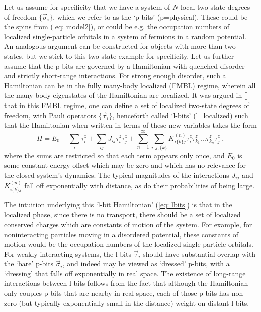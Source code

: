 \documentclass[amsmath,onecolumn, superscriptaddress,preprint,aps]{revtex4}
\renewcommand{\cite}[1]{[\onlinecite{#1}]}
\begin{document}
Let us assume for specificity that we have a system of $N$ local two-state degrees of freedom $\{\vec{\sigma}_i \}$, which we refer to as the `p-bits' (p=physical).
These could be the spins from (\ref{eq: model2}), or could be e.g. the occupation numbers of localized single-particle orbitals in a system of fermions in a
random potential.  An analogous argument can be constructed for objects with more than two states, but we stick to this two-state example for specificity.
Let us further assume that the p-bits are governed by a Hamiltonian with quenched disorder and strictly short-range interactions.
For strong enough disorder, such a Hamiltonian can be in the fully many-body localized (FMBL) regime,
wherein all the many-body eigenstates of the Hamiltonian are localized.
It was argued in \cite{Lbits, Abanin2, Abanin1, Lbits2} that in this FMBL regime, one can define a set of localized two-state degrees of freedom, with Pauli operators
$\{\vec{\tau}_i\}$, henceforth called `l-bits' (l=localized) such that the Hamiltonian when written in terms of these new variables takes the form
%
\begin{equation}
H = E_0 + \sum_{i} \tau^z_i + \sum_{ij} J_{ij} \tau^z_i \tau^z_j + \sum_{n=1}^{\infty} \sum_{i,j,\{k\}} K^{(n)}_{i \{k\} j } \tau^z_i \tau^z_{k_1}...\tau^z_{k_n} \tau^z_j ~, \label{eq: lbits}
\end{equation}
%
where the sums are restricted so that each term appears only once, and $E_0$ is some constant energy offset which may be zero and which has no relevance for the
closed system's dynamics.  The typical magnitudes of the interactions $J_{ij}$ and $K^{(n)}_{i \{k\} j }$ fall off exponentially with distance,
as do their probabilities of being large.

The intuition underlying this `l-bit Hamiltonian' (\ref{eq: lbits}) is that in the localized phase, since there is no transport, there should be a set of localized conserved charges which are constants of motion of the system. For example, for noninteracting particles moving in a disordered potential, these constants of motion would be the occupation numbers of the localized single-particle orbitals.  For weakly interacting systems, the l-bits $\vec{\tau}_i$ should have substantial overlap with the `bare' p-bits $\vec{\sigma}_i$, and indeed may be viewed as `dressed' p-bits, with a `dressing' that falls off exponentially in real space. The existence of long-range interactions between l-bits follows from the fact that although the Hamiltonian only couples p-bits that are nearby in real space, each of those p-bits has non-zero (but typically exponentially small in the distance) weight on distant l-bits.
\end{document}
